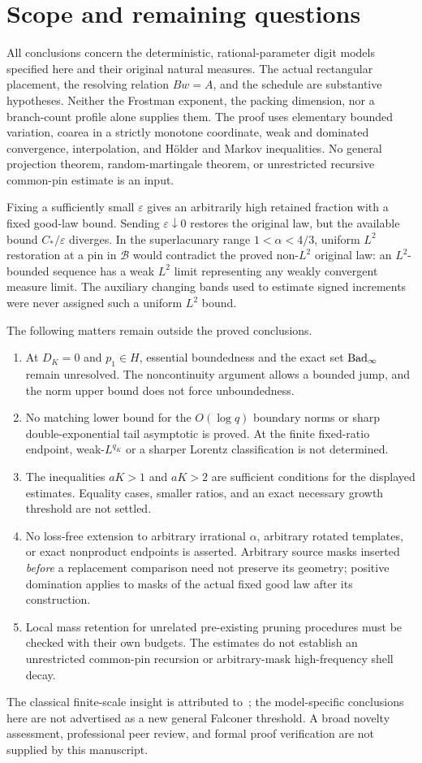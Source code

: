 \section{Scope and remaining questions}\label{sec:scope}
All conclusions concern the deterministic, rational-parameter digit models
specified here and their original natural measures. The actual rectangular
placement, the resolving relation $Bw=A$, and the schedule are substantive
hypotheses. Neither the Frostman exponent, the packing dimension, nor a
branch-count profile alone supplies them. The proof uses elementary bounded
variation, coarea in a strictly monotone coordinate, weak and dominated
convergence, interpolation, and H\"older and Markov inequalities. No general
projection theorem, random-martingale theorem, or unrestricted recursive
common-pin estimate is an input.

Fixing a sufficiently small $\varepsilon$ gives an arbitrarily high
retained fraction with a fixed good-law bound. Sending
$\varepsilon\downarrow0$ restores the original law, but the available
bound $C_*/\varepsilon$ diverges. In the superlacunary range
$1<\alpha<4/3$, uniform $L^2$ restoration at a pin in $\mathcal B$
would contradict the proved non-$L^2$ original law: an $L^2$-bounded
sequence has a weak $L^2$ limit representing any weakly convergent measure
limit. The auxiliary changing bands used to estimate signed increments
were never assigned such a uniform $L^2$ bound.

The following matters remain outside the proved conclusions.
\begin{enumerate}[leftmargin=*]
\item At $D_K=0$ and $p_1\in H$, essential boundedness and the exact
set $\operatorname{Bad}_\infty$ remain unresolved. The noncontinuity argument allows a
bounded jump, and the norm upper bound does not force unboundedness.
\item No matching lower bound for the $O(\log q)$ boundary norms or
sharp double-exponential tail asymptotic is proved. At the finite
fixed-ratio endpoint, weak-$L^{q_K}$ or a sharper Lorentz classification
is not determined.
\item The inequalities $aK>1$ and $aK>2$ are sufficient conditions
for the displayed estimates. Equality cases, smaller ratios, and an exact
necessary growth threshold are not settled.
\item No loss-free extension to arbitrary irrational $\alpha$, arbitrary
rotated templates, or exact nonproduct endpoints is asserted. Arbitrary
source masks inserted \emph{before} a replacement comparison need not
preserve its geometry; positive domination applies to masks of the actual
fixed good law after its construction.
\item Local mass retention for unrelated pre-existing pruning procedures
must be checked with their own budgets. The estimates do not establish
an unrestricted common-pin recursion or arbitrary-mask high-frequency
shell decay.
\end{enumerate}
The classical finite-scale insight is attributed to~\cite{GIOW}; the
model-specific conclusions here are not advertised as a new general
Falconer threshold. A broad novelty assessment, professional peer review,
and formal proof verification are not supplied by this manuscript.
